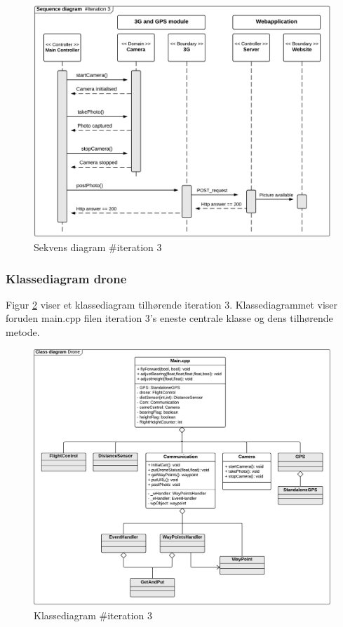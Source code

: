 \vspace{-0.2cm}
\begin{figure}[H]
	\centering
	\includegraphics[width=1\textwidth]{Billeder/sekvens/sekvens_iteration3}
	\caption{Sekvens diagram \#iteration 3}
	\label{fig:Sekvens_diagram_iteration3}
\end{figure}
\vspace{-0.2cm}

\newpage

\subsubsection*{Klassediagram drone}

Figur \ref{fig:classDiagram_iteration3} viser et klassediagram tilhørende iteration 3. Klassediagrammet viser foruden main.cpp filen iteration 3's eneste centrale klasse og dens tilhørende metode. 

\begin{figure}[H]
	\centering
	\includegraphics[width=1\textwidth]{Billeder/klasse_diagrammer/classdiagram_iteration3_drone.png}
	\vspace{-0.5cm}
	\caption{Klassediagram \#iteration 3}
	\label{fig:classDiagram_iteration3}
\end{figure}

